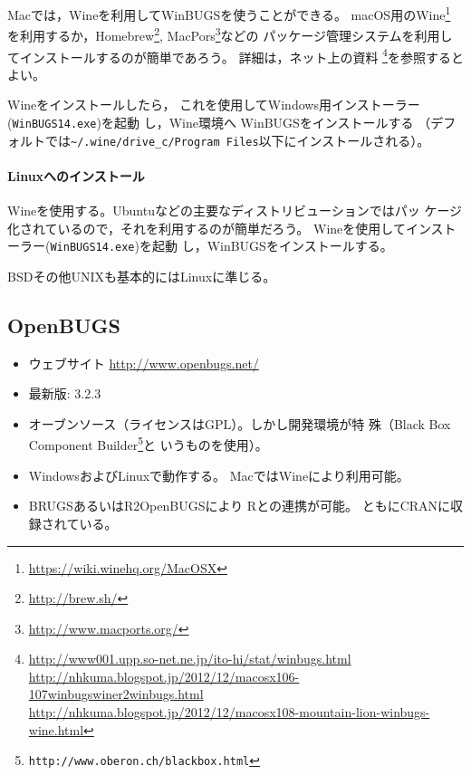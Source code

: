 \documentclass[11pt,uplatex]{jsarticle}
\begin{document}
Macでは，\textsf{Wine}を利用して\textsf{WinBUGS}を使うことができる。
macOS用の\textsf{Wine}\footnote{\url{https://wiki.winehq.org/MacOSX}}
を利用するか，\textsf{Homebrew}\footnote{\url{http://brew.sh/}}, \textsf{MacPors}\footnote{\url{http://www.macports.org/}}などの
パッケージ管理システムを利用してインストールするのが簡単であろう。
詳細は，ネット上の資料
\footnote{\url{http://www001.upp.so-net.ne.jp/ito-hi/stat/winbugs.html}\\
\url{http://nhkuma.blogspot.jp/2012/12/macosx106-107winbugswiner2winbugs.html}\\
\url{http://nhkuma.blogspot.jp/2012/12/macosx108-mountain-lion-winbugs-wine.html}}を参照するとよい。


\textsf{Wine}をインストールしたら，
これを使用してWindows用インストーラー
(\texttt{WinBUGS14.exe})を起動
し，\textsf{Wine}環境へ
\textsf{WinBUGS}をインストールする
（デフォルトでは\texttt{\textasciitilde/.wine/drive\_c/Program Files}以下にインストールされる）。


\paragraph{Linuxへのインストール}
\textsf{Wine}を使用する。Ubuntuなどの主要なディストリビューションではパッ
ケージ化されているので，それを利用するのが簡単だろう。
\textsf{Wine}を使用してインストーラー(\texttt{WinBUGS14.exe})を起動
し，\textsf{WinBUGS}をインストールする。

BSDその他UNIXも基本的にはLinuxに準じる。

\subsection{OpenBUGS}

\begin{itemize}
\item ウェブサイト \url{http://www.openbugs.net/}
\item 最新版: 3.2.3
\item オーブンソース（ライセンスはGPL）。しかし開発環境が特
  殊（Black Box Component Builder\footnote{\texttt{http://www.oberon.ch/blackbox.html}}と
  いうものを使用）。
\item WindowsおよびLinuxで動作する。
Macでは\textsf{Wine}により利用可能。
\item \textsf{BRUGS}あるいは\textsf{R2OpenBUGS}により
\textsf{R}との連携が可能\cite{Thomas}。
ともにCRANに収録されている。
\end{itemize}
\end{document}

